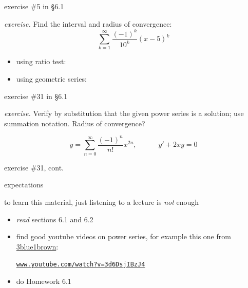 \documentclass[dvipsnames,colorlinks]{beamer}
\begin{document}
\begin{frame}{exercise \#5 in \S 6.1}

\noindent \emph{exercise.}  Find the interval and radius of convergence:
    $$\sum_{k=1}^\infty \frac{(-1)^k}{10^k} (x-5)^k$$

\begin{itemize}
\item using ratio test:

\vspace{20mm}
\item using geometric series:

\vspace{20mm}
\end{itemize}
\end{frame}


\begin{frame}{exercise \#31 in \S 6.1}

\noindent \emph{exercise.}  Verify by substitution that the given power series is a solution; use summation notation.  Radius of convergence?

$$y=\sum_{n=0}^\infty \frac{(-1)^n}{n!} x^{2n}, \qquad\quad y'+2xy=0$$

\vspace{50mm}
\end{frame}


\begin{frame}{exercise \#31, cont.}

\end{frame}


\begin{frame}{expectations}

to learn this material, just listening to a lecture is \emph{not} enough
     \begin{itemize}
     \item \emph{read} sections 6.1 and 6.2
     \item find good youtube videos on power series, for example this one from \href{https://www.youtube.com/@3blue1brown}{3blue1brown}:

\centerline{\href{https://www.youtube.com/watch?v=3d6DsjIBzJ4}{\texttt{www.youtube.com/watch?v=3d6DsjIBzJ4}}}

     \item do Homework 6.1
     \end{itemize}
\end{frame}
\end{document}
